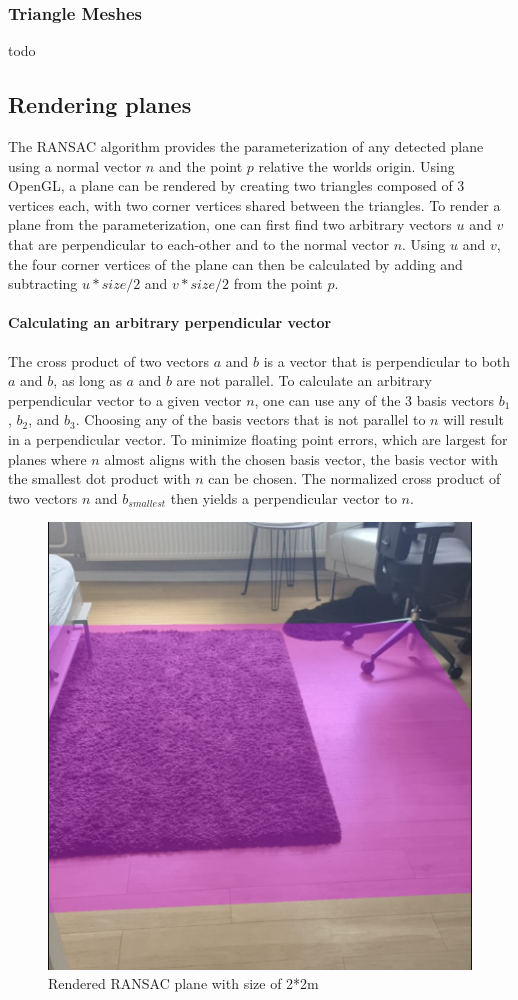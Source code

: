 \subsubsection{Triangle Meshes}
todo

\subsection{Rendering planes}
The RANSAC algorithm provides the parameterization of any detected plane using a normal vector $n$ and the point $p$ relative the worlds origin.
Using OpenGL, a plane can be rendered by creating two triangles composed of 3 vertices each, with two corner vertices shared between the triangles.
To render a plane from the parameterization, one can first find two arbitrary vectors $u$ and $v$
that are perpendicular to each-other and to the normal vector $n$.
Using $u$ and $v$, the four corner vertices of the plane can then be calculated by adding and subtracting $u * size / 2$ and $v * size / 2$ from the point $p$.

\paragraph{Calculating an arbitrary perpendicular vector}
The cross product of two vectors $a$ and $b$ is a vector that is perpendicular to both $a$ and $b$,
as long as $a$ and $b$ are not parallel.
To calculate an arbitrary perpendicular vector to a given vector $n$, one can use any of the 3 basis vectors ${b_1}$, ${b_2}$, and ${b_3}$.
Choosing any of the basis vectors that is not parallel to $n$ will result in a perpendicular vector.
To minimize floating point errors, which are largest for planes where $n$ almost aligns with the chosen basis vector,
the basis vector with the smallest dot product with $n$ can be chosen.
The normalized cross product of two vectors $n$ and $b_{smallest}$ then yields a perpendicular vector to $n$.

\begin{figure}[ht!]
    \centering
    \includegraphics[width=0.6\linewidth]{images/renderedPlane}
    \caption{Rendered RANSAC plane with size of 2*2m}
\end{figure}

